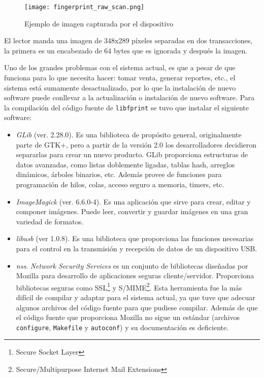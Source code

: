 \begin{figure}[htb]
 \begin{center}
  \texttt{[image: fingerprint\_raw\_scan.png]}
 \end{center}
 \caption{Ejemplo de imagen capturada por el dispositivo}
 \label{fig:finger_print_3}
\end{figure}

El lector manda una imagen de 348x289 píxeles separadas en dos transacciones, la primera es un encabezado de 64 bytes que es ignorada y después la imagen.

Uno de los grandes problemas con el sistema actual, es que a pesar de que funciona para lo que necesita hacer: tomar venta, generar reportes, etc., el sistema está sumamente desactualizado, por lo que la instalación de nuevo software puede conllevar a la actualización o instalación de nuevo software. Para la compilación del código fuente de \texttt{libfprint} se tuvo que instalar el siguiente software:

\begin{itemize}
 \item \textit{GLib} (ver. 2.28.0). Es una biblioteca de propósito general, originalmente parte de GTK+, pero a partir de la versión 2.0 los desarrolladores decidieron separarlas para crear un nuevo producto. GLib proporciona estructuras de datos avanzadas, como listas doblemente ligadas, tablas hash, arreglos dinámicos, árboles binarios, etc. Además provee de funciones para programación de hilos, colas, acceso seguro a memoria, timers, etc.
 \item \textit{ImageMagick} (ver. 6.6.0-4). Es una aplicación que sirve para crear, editar y componer imágenes. Puede leer, convertir y guardar imágenes en una gran variedad de formatos.
 \item \textit{libusb} (ver 1.0.8). Es una biblioteca que proporciona las funciones necesarias para el control en la transmisión y recepción de datos de un dispositivo USB.
 \item \textit{nss}. \textit{Network Security Services} es un conjunto de bibliotecas diseñadas por Mozilla para desarrollo de aplicaciones seguras cliente/servidor. Proporciona bibliotecas seguras como SSL\footnote{Secure Socket Layer} y S/MIME\footnote{Secure/Multipurpose Internet Mail Extensions}. Esta herramienta fue la más difícil de compilar y adaptar para el sistema actual, ya que tuve que adecuar algunos archivos del código fuente para que pudiese compilar. Además de que el código fuente que proporciona Mozilla no sigue un estándar (archivos \texttt{configure}, \texttt{Makefile} y \texttt{autoconf}) y su documentación es deficiente.
\end{itemize} 

